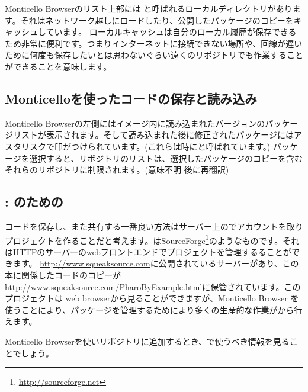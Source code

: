 \documentclass[a4paper,10pt,twoside]{book}
\begin{document}
Monticello Browserのリスト上部には と呼ばれるローカルディレクトリがあります。それはネットワーク越しにロードしたり、公開したパッケージのコピーをキャッシュしています。
ローカルキャッシュは自分のローカル履歴が保存できるため非常に便利です。つまりインターネットに接続できない場所や、回線が遅いために何度も保存したいとは思わないぐらい遠くのリポジトリでも作業することができることを意味します。


\subsection{Monticelloを使ったコードの保存と読み込み}
Monticello Browserの左側にはイメージ内に読み込まれたバージョンのパッケージリストが表示されます。そして読み込まれた後に修正されたパッケージにはアスタリスクで印がつけられています。(これらは時にと呼ばれています。) パッケージを選択すると、リポジトリのリストは、選択したパッケージのコピーを含むそれらのリポジトリに制限されます。(意味不明 後に再翻訳)



\subsection{\ind{\sqsrc}: \pharo のための}
コードを保存し、また共有する一番良い方法は\sqsrc サーバー上のでアカウントを取りプロジェクトを作ることだと考えます。\sqsrc はSourceForge\footnote{\url{http://sourceforge.net}}のようなものです。それはHTTPのサーバーのwebフロントエンドでプロジェクトを管理するることができます。
\url{http://www.squeaksource.com}に公開されている\sqsrc サーバーがあり、この本に関係したコードのコピーが\url{http://www.squeaksource.com/PharoByExample.html}に保管されています。このプロジェクトは web browserから見ることができますが、Monticello Browser を使うことにより、パッケージを管理するためにより多くの生産的な作業が\pharo から行えます。

Monticello Browserを使いリポジトリに追加するとき、\sqsrc で使うべき情報を見ることでしょう。
\end{document}
